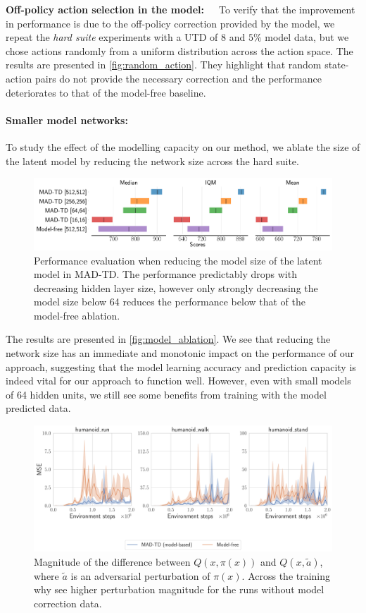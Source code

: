 \textbf{Off-policy action selection in the model:}~~~To verify that the  improvement in performance is due to the off-policy correction provided by the model, we repeat the \emph{hard suite} experiments with a UTD of $8$ and $5\%$ model data, but we chose actions randomly from a uniform distribution across the action space.
The results are presented in \autoref{fig:random_action}.
They highlight that random state-action pairs do not provide the necessary correction and the performance deteriorates to that of the model-free baseline.

\paragraph{Smaller model networks:}To study the effect of the modelling capacity on our method, we ablate the size of the latent model by reducing the network size across the hard suite.
\begin{figure}[b]
    \centering
    \includegraphics[width=1.0\linewidth]{figures/mad-td/model_ablation_rliable.pdf}
    \caption{Performance evaluation when reducing the model size of the latent model in MAD-TD. The performance predictably drops with decreasing hidden layer size, however only strongly decreasing the model size below 64 reduces the performance below that of the model-free ablation.}
    \label{fig:model_ablation}
\end{figure}
The results are presented in \autoref{fig:model_ablation}.
We see that reducing the network size has an immediate and monotonic impact on the performance of our approach, suggesting that the model learning accuracy and prediction capacity is indeed vital for our approach to function well.
However, even with small models of 64 hidden units, we still see some benefits from training with the model predicted data.

\begin{figure}[t]
    \centering
    \includegraphics[width=0.75\linewidth]{figures/mad-td/adv_examples.pdf}
    \caption{Magnitude of the difference between $Q(x,\pi(x))$ and $Q(x,\tilde{a})$, where $\tilde{a}$ is an adversarial perturbation of $\pi(x)$. Across the training why see higher perturbation magnitude for the runs without model correction data.}
    \label{fig:adv}
\end{figure}

